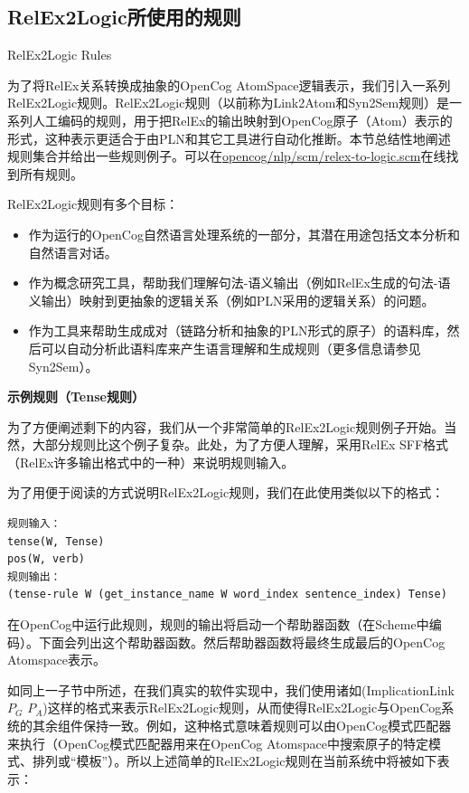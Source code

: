 \subsection{RelEx2Logic所使用的规则}{RelEx2Logic Rules}

为了将RelEx关系转换成抽象的OpenCog AtomSpace逻辑表示，我们引入一系列RelEx2Logic规则。RelEx2Logic规则（以前称为Link2Atom和Syn2Sem规则\cite{Lian2012}）是一系列人工编码的规则，用于把RelEx的输出映射到OpenCog原子（Atom）表示的形式，这种表示更适合于由PLN和其它工具进行自动化推断。本节总结性地阐述规则集合并给出一些规则例子。可以在\url{opencog/nlp/scm/relex-to-logic.scm}在线找到所有规则。

RelEx2Logic规则有多个目标：

\begin{itemize}
\item 作为运行的OpenCog自然语言处理系统的一部分，其潜在用途包括文本分析和自然语言对话。
\item 作为概念研究工具，帮助我们理解句法-语义输出（例如RelEx生成的句法-语义输出）映射到更抽象的逻辑关系（例如PLN采用的逻辑关系）的问题。
\item 作为工具来帮助生成成对（链路分析和抽象的PLN形式的原子）的语料库，然后可以自动分析此语料库来产生语言理解和生成规则（更多信息请参见Syn2Sem）。
\end{itemize}

{\bf 示例规则（Tense规则）}

为了方便阐述剩下的内容，我们从一个非常简单的RelEx2Logic规则例子开始。当然，大部分规则比这个例子复杂。此处，为了方便人理解，采用RelEx SFF格式（RelEx许多输出格式中的一种）来说明规则输入。

为了用便于阅读的方式说明RelEx2Logic规则，我们在此使用类似以下的格式：

\begin{verbatim}
规则输入：
tense(W, Tense)
pos(W, verb)
规则输出：
(tense-rule W (get_instance_name W word_index sentence_index) Tense)
\end{verbatim}

在OpenCog中运行此规则，规则的输出将启动一个帮助器函数（在Scheme中编码）。下面会列出这个帮助器函数。然后帮助器函数将最终生成最后的OpenCog Atomspace表示。

如同上一子节中所述，在我们真实的软件实现中，我们使用诸如(ImplicationLink $P_G$ $P_A$)这样的格式来表示RelEx2Logic规则，从而使得RelEx2Logic与OpenCog系统的其余组件保持一致。例如，这种格式意味着规则可以由OpenCog模式匹配器来执行（OpenCog模式匹配器用来在OpenCog Atomspace中搜索原子的特定模式、排列或“模板”）。所以上述简单的RelEx2Logic规则在当前系统中将被如下表示：

